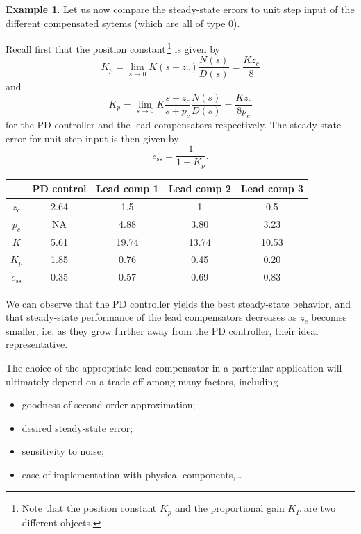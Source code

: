 \documentclass[a4paper,11pt]{report}
\theoremstyle{definition}
\newcommand{\sse}{\mathrm{ss}}
\newtheorem{mdexample}{Example}
\newenvironment{example}%
  {\vspace{0.1cm}\begin{mdframed}[backgroundcolor=lightgray]\begin{mdexample}}%
  {\end{mdexample}\end{mdframed}\vspace{0.1cm}}
\begin{document}
\begin{example}
  Let us now compare the steady-state errors to unit step input of the
  different compensated sytems (which are all of type 0).

  Recall first that the position constant\,\footnote{Note that the
    position constant $K_p$ and the proportional gain $K_P$ are two
    different objects.} is given by
  \[
  K_p = \lim_{s\to 0} K(s+z_c)\frac{N(s)}{D(s)} = \frac{Kz_c}{8}
  \]
  and
  \[
  K_p = \lim_{s\to 0} K\frac{s+z_c}{s+p_c}\frac{N(s)}{D(s)} = \frac{Kz_c}{8p_c}
  \]
  for the PD controller and the lead compensators respectively. The
  steady-state error for unit step input is then given by
  \[
  e_\sse = \frac{1}{1+K_p}.
  \]

  \vspace{0.2cm}

  \begin{tabular}{|c|c|c|c|c|}
    \hline
    &PD control&Lead comp 1&Lead comp 2&Lead comp 3\\\hline
    $z_c$&2.64&1.5&1&0.5\\\hline      
    $p_c$&NA&4.88&3.80&3.23\\\hline      
    $K$&5.61&19.74&13.74&10.53\\\hline      
    $K_p$&1.85&0.76&0.45&0.20\\\hline      
    $e_\sse$&0.35&0.57&0.69&0.83\\\hline      
  \end{tabular}

  \vspace{0.2cm}

  We can observe that the PD controller yields the best steady-state
  behavior, and that steady-state performance of the lead compensators
  decreases as $z_c$ becomes smaller, i.e. as they grow further away
  from the PD controller, their ideal representative.

  The choice of the appropriate lead compensator in a particular
  application will ultimately depend on a trade-off among many
  factors, including
  \begin{itemize}
  \item goodness of second-order approximation;
  \item desired steady-state error;
  \item sensitivity to noise;
  \item ease of implementation with physical components,\dots
  \end{itemize}
\end{example}
\end{document}
